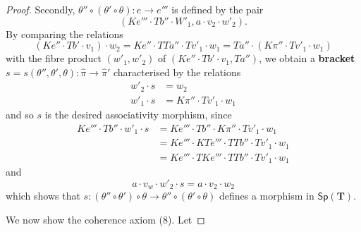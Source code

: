 \documentclass[fleqn]{article}
\newcommand{\oldpage}[1]{\marginpar{\footnotesize$\Big\vert$ \textit{p.~#1}}}
\newcommand{\unsure}[1]{{\color{purple}\textbf{#1}}}
\newcommand{\TT}{\mathbf{T}}
\newcommand{\Cat}[1]{\mathsf{#1}}
\newcommand{\Sp}[1]{\Cat{Sp}(#1)}
\begin{document}
\begin{proof}
  \oldpage{33}
  Secondly, $\theta''\circ(\theta'\circ\theta)\colon e\to e'''$ is defined by the pair
  \[
    (Ke'''\cdot Tb''\cdot W'_1,
    a\cdot v_2\cdot w'_2).
  \]
  By comparing the relations
  \[
    (Ke''\cdot Tb'\cdot v_1)\cdot w_2
    = Ke''\cdot TTa''\cdot Tv'_1\cdot w_1
    = Ta''\cdot(K\pi''\cdot Tv'_1\cdot w_1)
  \]
  with the fibre product $(w'_1,w'_2)$ of $(Ke''\cdot Tb'\cdot v_1, Ta'')$, we obtain a \unsure{bracket} $s=s(\theta'',\theta',\theta)\colon\hat{\pi}\to\hat{\pi}'$ characterised by the relations
  \[
    \begin{aligned}
      w'_2\cdot s
      &= w_2
    \\w'_1\cdot s
      &= K\pi''\cdot Tv'_1\cdot w_1
    \end{aligned}
  \]
  and so $s$ is the desired associativity morphism, since
  \[
    \begin{aligned}
      Ke'''\cdot Tb''\cdot w'_1\cdot s
      &= Ke'''\cdot Tb''\cdot K\pi''\cdot Tv'_1\cdot w_1
    \\&=Ke'''\cdot KTe'''\cdot TTb''\cdot Tv'_1\cdot w_1
    \\&= Ke'''\cdot TKe'''\cdot TTb''\cdot Tv'_1\cdot w_1
    \end{aligned}
  \]
  and
  \[
    a\cdot v_w\cdot w'_2\cdot s
    = a\cdot v_2\cdot w_2
  \]
  which shows that $s\colon(\theta''\circ\theta')\circ\theta\to\theta''\circ(\theta'\circ\theta)$ defines a morphism in $\Sp{\TT}$.

  We now show the coherence axiom (8).
  Let
\end{proof}




\nocite{*}
\printbibliography[heading=bibintoc,title=Bibliography]
\end{document}
